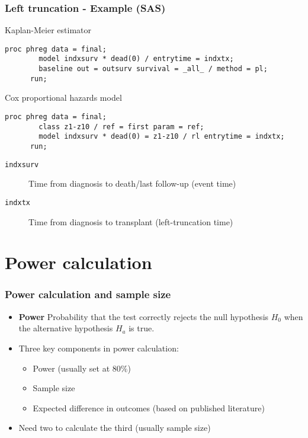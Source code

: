 \documentclass[11pt, aspectratio = 169]{beamer}
\begin{document}
\begin{frame}[fragile]
  \frametitle{Left truncation - Example (SAS)}
  \begin{block}{Kaplan-Meier estimator}
    \begin{lstlisting}[gobble = 6]
      proc phreg data = final;
        model indxsurv * dead(0) / entrytime = indxtx;
        baseline out = outsurv survival = _all_ / method = pl;
      run;
    \end{lstlisting}
  \end{block}
  \begin{block}{Cox proportional hazards model}
    \begin{lstlisting}[gobble = 6]
      proc phreg data = final;
        class z1-z10 / ref = first param = ref;
        model indxsurv * dead(0) = z1-z10 / rl entrytime = indxtx;
      run;
    \end{lstlisting}
  \end{block}
  \begin{description}
    \item[\texttt{indxsurv}] Time from diagnosis to death/last follow-up (event time)
    \item[\texttt{indxtx}] Time from diagnosis to transplant (left-truncation time) 
  \end{description}
\end{frame}

\section{Power calculation}

\begin{frame}
  \frametitle{Power calculation and sample size}
  \begin{itemize}
    \item \textbf{Power} Probability that the test correctly rejects the null hypothesis $H_0$ when the alternative hypothesis $H_a$ is true.
    \item Three key components in power calculation:
    \begin{itemize}
      \item Power (usually set at $80\%$)
      \item Sample size
      \item Expected difference in outcomes (based on published literature)
    \end{itemize}
    \item Need two to calculate the third (usually sample size)
  \end{itemize}
\end{frame}
\end{document}
